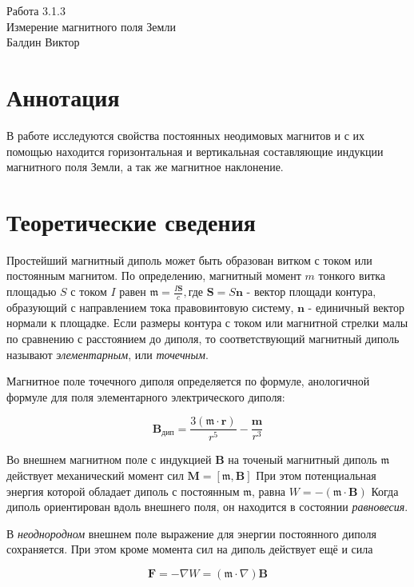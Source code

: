 \documentclass[a4paper,12pt]{article}
\begin{document}
\begin{center}
  \LARGE{Работа 3.1.3}\\[0.2cm]
  \LARGE{Измерение магнитного поля Земли}\\[0.2cm]
  \large{Балдин Виктор}\\[0.2cm]
\end{center}


\section{Аннотация}

В работе исследуются свойства постоянных неодимовых магнитов и с их помощью находится горизонтальная и вертикальная составляющие индукции магнитного поля Земли, а так же магнитное наклонение.

\section{Теоретические сведения}

Простейший магнитный диполь может быть образован витком с током или постоянным магнитом. По определению, магнитный момент $m$ тонкого витка площадью $S$ с током $I$ равен $\mathfrak{m} = \frac{I\textbf{S}}{c}, $где $\textbf{S} = S\textbf{n}$ - вектор площади контура, образующий с направлением тока правовинтовую систему, $\textbf{n}$ - единичный вектор нормали к площадке. Если размеры контура с током или магнитной стрелки малы по сравнению с расстоянием до диполя, то соответствующий магнитный диполь называют \textit{элементарным}, или \textit{точечным}.

Магнитное поле точечного диполя определяется по формуле, анологичной формуле для поля элементарного электрического диполя:

\[ \textbf{B}_{дип} = \frac{3(\mathfrak{m} \cdot \textbf{r})}{r^5} - \frac{\textbf{m}}{r^3}\]

Во внешнем магнитном поле с индукцией $\textbf{B}$ на точеный магнитный диполь $\mathfrak{m}$ действует механический момент сил $\textbf{M}=[\mathfrak{m}, \textbf{B}] $
При этом потенциальная энергия которой обладает диполь с постоянным $\mathfrak{m}$, равна
$W = -(\mathfrak{m} \cdot \textbf{B})$
Когда диполь ориентирован вдоль внешнего поля, он находится в состоянии \textit{равновесия}.

В \textit{неоднородном} внешнем поле выражение для энергии постоянного диполя сохраняется. При этом кроме момента сил на диполь действует ещё и сила

\[\textbf{F} = -\nabla W = (\mathfrak{m} \cdot \nabla)\textbf{B}\]
\end{document}
